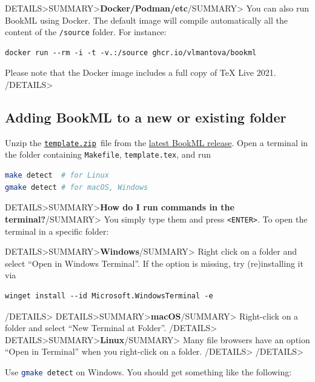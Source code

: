 \documentclass[a4paper,british]{article}
\newenvironment{foldedframe}[1][]{%
    \<DETAILS>\<SUMMARY>\textbf{#1}\</SUMMARY>}%
  {\</DETAILS>}
\newenvironment{foldedframe}[1][]{\bgroup\colorlet{TFFrameColor}{SpringGreen}
  \colorlet{TFTitleColor}{black}\begin{titled-frame}{#1}}{\end{titled-frame}\egroup}
\def\cmdinline{\lstinline[language=bash,frame=none]}
\begin{document}
\begin{foldedframe}[Docker/Podman/etc]
  You can also run BookML using Docker. The default image will compile automatically all the content of the \texttt{/source} folder. For instance:
  \begin{lstlisting}
docker run --rm -i -t -v.:/source ghcr.io/vlmantova/bookml
  \end{lstlisting}
  Please note that the Docker image includes a full copy of TeX Live 2021.
\end{foldedframe}

\subsection{Adding BookML to a new or existing folder}\label{adding-bookml}

Unzip the \texttt{\href{https://github.com/vlmantova/bookml/releases/latest/download/template.zip}{template.zip} }file from the \href{https://github.com/vlmantova/bookml/releases/latest}{latest BookML release}. Open a terminal in the folder containing \texttt{Makefile}, \texttt{template.tex}, and run
\begin{lstlisting}[language=bash]
make detect  # for Linux
gmake detect # for macOS, Windows
\end{lstlisting}

\begin{foldedframe}[How do I run commands in the terminal?]
  You simply type them and press \texttt{<ENTER>}. To open the terminal in a specific folder:

  \begin{foldedframe}[Windows]
    Right click on a folder and select ``Open in Windows Terminal''. If the option is missing, try (re)installing it via
    \begin{lstlisting}
winget install --id Microsoft.WindowsTerminal -e
    \end{lstlisting}
  \end{foldedframe}
  \begin{foldedframe}[macOS]
    Right-click on a folder and select ``New Terminal at Folder''.
  \end{foldedframe}
  \begin{foldedframe}[Linux]
    Many file browsers have an option ``Open in Terminal'' when you right-click on a folder.
  \end{foldedframe}
\end{foldedframe}

Use \cmdinline|gmake detect| on Windows. You should get something like the following:
\end{document}
